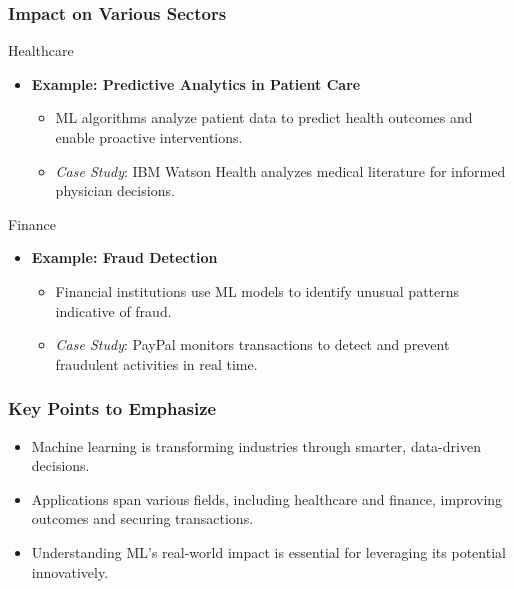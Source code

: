 \documentclass{beamer}
\begin{document}
\begin{frame}[fragile]
    \frametitle{Impact on Various Sectors}
    \begin{block}{Healthcare}
        \begin{itemize}
            \item \textbf{Example: Predictive Analytics in Patient Care}
              \begin{itemize}
                \item ML algorithms analyze patient data to predict health outcomes and enable proactive interventions.
                \item \textit{Case Study}: IBM Watson Health analyzes medical literature for informed physician decisions.
              \end{itemize}
        \end{itemize}
    \end{block}
    
    \begin{block}{Finance}
        \begin{itemize}
            \item \textbf{Example: Fraud Detection}
              \begin{itemize}
                \item Financial institutions use ML models to identify unusual patterns indicative of fraud.
                \item \textit{Case Study}: PayPal monitors transactions to detect and prevent fraudulent activities in real time.
              \end{itemize}
        \end{itemize}
    \end{block}
\end{frame}

\begin{frame}[fragile]
    \frametitle{Key Points to Emphasize}
    \begin{itemize}
        \item Machine learning is transforming industries through smarter, data-driven decisions.
        \item Applications span various fields, including healthcare and finance, improving outcomes and securing transactions.
        \item Understanding ML's real-world impact is essential for leveraging its potential innovatively.
    \end{itemize}
\end{frame}
\end{document}
